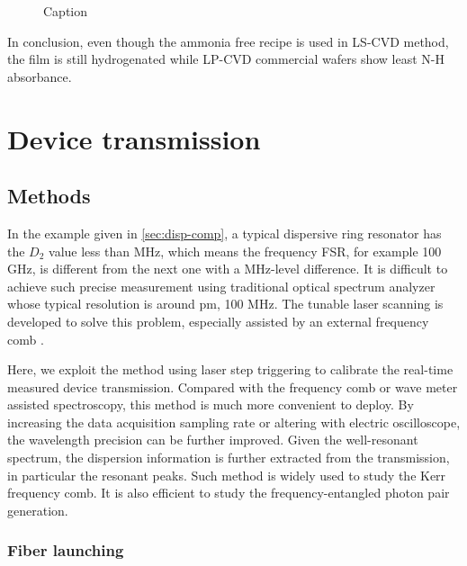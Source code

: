 \begin{figure}
	\centering
	
	\caption{Caption}
	\label{fig:ftir}
\end{figure}

In conclusion, even though the ammonia free recipe is used in LS-CVD method, the film is still hydrogenated while LP-CVD commercial wafers show least N-H absorbance.



\begin{figure}
	\centering
	
	\label{fig:ellipso}
\end{figure}

\section{Device transmission}

\subsection{Methods}

In the example given in \autoref{sec:disp-comp},  a typical dispersive ring resonator has the $ D_2 $ value less than MHz, which means the frequency FSR, for example 100 GHz, is different from the next one with a MHz-level difference. It is difficult to achieve such precise measurement using traditional optical spectrum analyzer whose typical resolution is around pm, 100 MHz. The tunable laser scanning is developed to solve this problem, especially assisted by an external frequency comb \cite{Liu2016d}. 

Here, we exploit the method using laser step triggering to calibrate the real-time measured device transmission. Compared with the frequency comb or wave meter assisted spectroscopy, this method is much more convenient to deploy. By increasing the data acquisition sampling rate or altering with electric oscilloscope, the wavelength precision can be further improved.
Given the well-resonant spectrum, the dispersion information is further extracted from the transmission, in particular the resonant peaks. Such method is widely used to study the Kerr frequency comb. It is also efficient to study the frequency-entangled photon pair generation.

\subsubsection{Fiber launching} 

